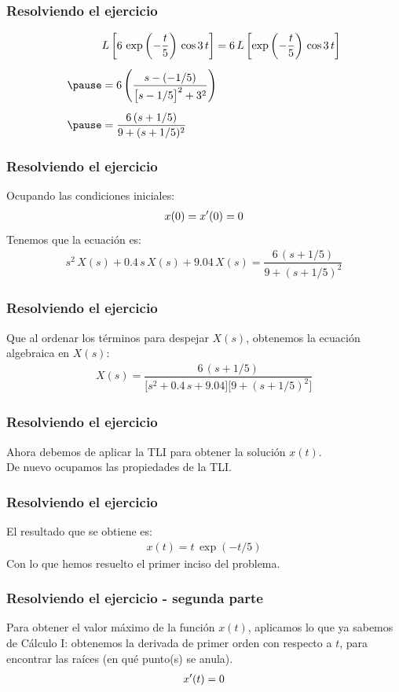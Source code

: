 \begin{frame}
\frametitle{Resolviendo el ejercicio}
\begin{eqnarray*}
\begin{aligned}
&L \left[ 6 \, \exp \left( -\dfrac{t}{5}\right) \, \cos 3 \, t \right] = 6 \, L \left[\exp \left( -\dfrac{t}{5}\right) \, \cos 3 \, t \right] \\[0.5em] \pause 
&= 6 \left( \dfrac{s - (-1/5)}{\big[s - 1/5\big]^{2} + 3^{2}} \right) \\[0.5em]  \pause
&= \dfrac{6 \, (s + 1/5)}{9 + (s + 1/5)^{2}}
\end{aligned}
\end{eqnarray*}
\end{frame}
\begin{frame}
\frametitle{Resolviendo el ejercicio}
Ocupando las condiciones iniciales:
\pause
\begin{align*}
x(0) = {x}^{\prime}(0) = 0
\end{align*}
\pause
Tenemos que la ecuación es:
\pause
\begin{align*}
s^{2} \, X(s) + 0.4 \, s \, X(s) + 9.04 \, X(s) = \dfrac{6 \, (s + 1/5)}{9 + (s + 1/5)^{2}}
\end{align*}
\end{frame}
\begin{frame}
\frametitle{Resolviendo el ejercicio}
Que al ordenar los términos para despejar $X(s)$, obtenemos la ecuación algebraica en $X(s)$:
\pause
\begin{align*}
X(s) = \dfrac{6 \, (s + 1/5)}{\big[s^{2} + 0.4 \, s + 9.04\big] \big[9 + (s + 1/5)^{2}\big]}
\end{align*}
\end{frame}
\begin{frame}
\frametitle{Resolviendo el ejercicio}
Ahora debemos de aplicar la TLI para obtener la solución $x(t)$.
\\
\bigskip
\pause
De nuevo ocupamos las propiedades de la TLI.
\end{frame}
\begin{frame}
\frametitle{Resolviendo el ejercicio}
El resultado que se obtiene es:
\begin{align*}
x(t) = t \, \exp (-t/5)
\end{align*}
Con lo que hemos resuelto el primer inciso del problema.
\end{frame}
\begin{frame}
\frametitle{Resolviendo el ejercicio - segunda parte}
Para obtener el valor máximo de la función $x(t)$, \pause aplicamos lo que ya sabemos de Cálculo I:  obtenemos la derivada de primer orden con respecto a $t$, para encontrar las raíces (en qué punto(s) se anula).
\pause
\begin{align*}
{x}^{\prime}(t) = 0
\end{align*}
\end{frame}
